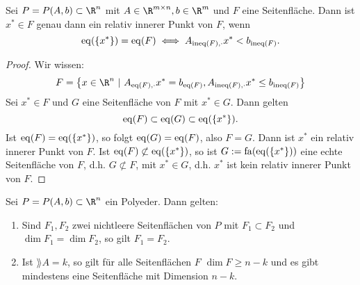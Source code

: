 \begin{satz}
  Sei $P = P(A,b) \subset  \R^n$ mit $A \in \R^{m \times n},b\in \R^m$ und $F$ eine Seitenfläche.
  Dann ist $x^* \in F$ genau dann ein relativ innerer Punkt von $F$, wenn 
  \begin{equation*}
    \operatorname{eq}(\left\{x^* \right\}) = \operatorname{eq}(F) \iff A_{\operatorname{ineq}(F),\cdot}x^* < b_{\operatorname{ineq}(F)}.
  \end{equation*} 
\end{satz}
\begin{proof}
	Wir wissen: 
	\begin{equation*}
		F = \left\{ x \in \R^n \ |\ A_{\eq(F),\cdot}x^* = b_{\eq(F)},A_{\ineq(F),\cdot}x^* \leq b_{\ineq(F)} \right\}
	\end{equation*}
	Sei $x^* \in F $ und $G$ eine Seitenfläche von $F$ mit $x^* \in G$. Dann gelten
	\begin{equation*}
		\operatorname{eq}(F) \subset \operatorname{eq}(G) \subset \operatorname{eq}(\left\{x^* \right\}).
	\end{equation*}
	Ist $\operatorname{eq}(F) = \operatorname{eq}( \left\{x^* \right\})$, so folgt $\operatorname{eq}(G) = \operatorname{eq}(F)$, also $F = G$.
	Dann ist $x^*$ ein relativ innerer Punkt von $F$.
	Ist $\operatorname{eq}(F) \not\subset \operatorname{eq}(\left\{x^* \right\})$, so ist $G:=\operatorname{fa}(\operatorname{eq}(\left\{x^* \right\}))$ eine echte Seitenfläche von $F$, d.h. $G \not\subset F$, mit $x^* \in G$, d.h. $x^*$ ist kein relativ innerer Punkt von $F$.
\end{proof}
\begin{korollar}
	Sei $P=P(A,b)\subset \R^n$ ein Polyeder. Dann gelten:
	\begin{enumerate}[label= (\alph*)]
		\item Sind $F_{1},F_{2}$ zwei nichtleere Seitenflächen von $P$ mit $F_{1}\subset F_{2}$ und $\dim F_{1} = \dim F_{2}$, so gilt $F_{1} = F_{2}$.
		\item Ist $\rang A = k$, so gilt für alle Seitenflächen $F$ $\dim F \geq n-k$ und es gibt mindestens eine Seitenfläche mit Dimension $n-k$.
	\end{enumerate}
\end{korollar}
